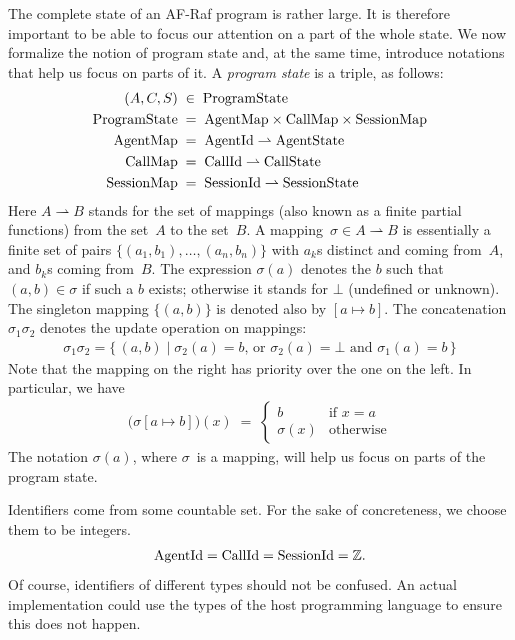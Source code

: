 \documentclass[a4paper,12pt,oneside,fleqn]{book} %
\newcommand{\pmap}{\rightharpoonup}
\begin{document}
The complete state of an AF-Raf program is rather large. It is therefore
important to be able to focus our attention on a part of the whole state.
We now formalize the notion of program state and, at the same time,
introduce notations that help us focus on parts of it. A \emph{program
state} is a triple, as follows:
\begin{align}
(A, C, S) &\;\in\; {\rm ProgramState}
\\
{\rm ProgramState} &\;=\;
  {\rm AgentMap}\times{\rm CallMap}\times{\rm SessionMap}
\\
{\rm AgentMap} &\;=\; {\rm AgentId}\pmap{\rm AgentState}
\\
{\rm CallMap} &\;=\; {\rm CallId}\pmap{\rm CallState}
\\
{\rm SessionMap} &\;=\; {\rm SessionId}\pmap{\rm SessionState}
\end{align}
Here $A\pmap B$ stands for the set of mappings (also known as a finite
partial functions) from the set~$A$ to the set~$B$. A mapping~$\sigma\in
A\pmap B$ is essentially a finite set of pairs
$\{(a_1,b_1),\ldots,(a_n,b_n)\}$ with $a_k$s distinct and coming from~$A$,
and $b_k$s coming from~$B$. The expression $\sigma(a)$ denotes the $b$ such
that $(a,b)\in\sigma$ if such a $b$ exists; otherwise it stands for $\bot$
(undefined or unknown). The singleton mapping $\{(a,b)\}$ is denoted also by
$[a\mapsto b]$.  The concatenation $\sigma_1\sigma_2$ denotes the update
operation on mappings:
\begin{align}
\sigma_1\sigma_2 = \{\,(a,b)\mid
  \text{$\sigma_2(a)=b$, or $\sigma_2(a)=\bot$ and $\sigma_1(a)=b$}\,\}
\end{align}
Note that the mapping on the right has priority over the one on the left.
In particular, we have
\begin{align}
\bigl(\sigma[a\mapsto b]\bigr)(x) \;=\;
  \begin{cases}
  b & \text{if $x=a$} \\
  \sigma(x) & \text{otherwise}
  \end{cases}
\end{align}
The notation $\sigma(a)$, where $\sigma$~is a mapping, will help us focus
on parts of the program state.

Identifiers come from some countable set. For the sake of concreteness, we
choose them to be integers.
\begin{align}
{\rm AgentId} = {\rm CallId} = {\rm SessionId} = \mathbb{Z}.
\end{align}
Of course, identifiers of different types should not be confused. An actual
implementation could use the types of the host programming language to
ensure this does not happen.
\end{document}
